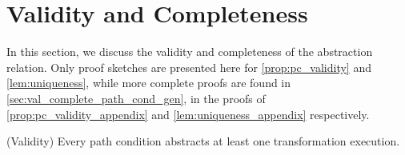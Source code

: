 \section{Validity and Completeness}
\label{subsec:abstraction_relation_validity_completeness}

In this section, we discuss the validity and completeness of the abstraction relation. Only proof sketches are presented here for \cref{prop:pc_validity} and \cref{lem:uniqueness}, while more complete proofs are found in \cref{sec:val_complete_path_cond_gen}, in the proofs of \cref{prop:pc_validity_appendix} and \cref{lem:uniqueness_appendix} respectively.


\begin{proposition}{(Validity)}
\label{prop:pc_validity}
Every path condition abstracts at least one transformation execution.
\end{proposition}
